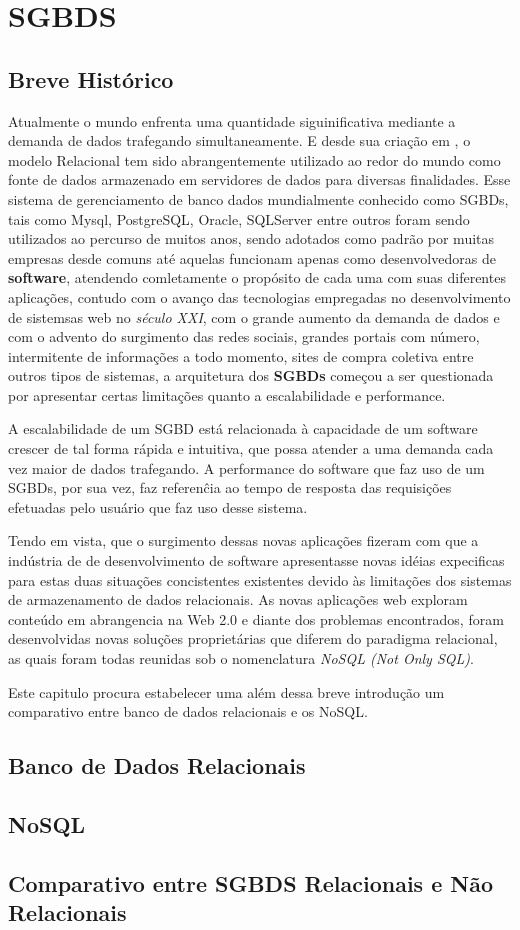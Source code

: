\chapter{SGBDS}
\thispagestyle{empty}

\section{Breve Histórico}
Atualmente o mundo enfrenta uma quantidade siguinificativa mediante a demanda de dados trafegando simultaneamente. E desde sua criação
em \cite{COOD}, o modelo Relacional tem sido abrangentemente utilizado ao redor do mundo como fonte de dados armazenado em servidores de dados para diversas
finalidades. Esse sistema de gerenciamento de banco dados mundialmente conhecido como SGBDs, tais como Mysql, PostgreSQL, Oracle, SQLServer entre outros
foram sendo utilizados ao percurso de muitos anos, sendo adotados como padrão por muitas empresas desde comuns até aquelas funcionam apenas como desenvolvedoras
de \textbf{software}, atendendo comletamente o propósito de cada uma com suas diferentes aplicações, contudo com o avanço das tecnologias empregadas no desenvolvimento
de sistemsas web no \textit{século XXI}, com o grande aumento da demanda de dados e com o advento do surgimento das redes sociais, grandes portais com número, intermitente de 
informações a todo momento, sites de compra coletiva entre outros tipos de sistemas, a arquitetura dos \textbf{SGBDs} começou a ser questionada por apresentar certas limitações 
quanto a escalabilidade e performance.

A escalabilidade de um SGBD está relacionada à capacidade de um software crescer de tal forma rápida e intuitiva, que possa atender a uma demanda cada vez maior de 
dados trafegando. A performance do software que faz uso de um SGBDs, por sua vez, faz referenĉia ao tempo de resposta das requisições efetuadas pelo usuário que faz uso desse sistema.

Tendo em vista, que o surgimento dessas novas aplicações fizeram com que a indústria de de desenvolvimento de software apresentasse novas idéias expecificas para estas duas situações concistentes
existentes devido às limitações dos sistemas de armazenamento de dados relacionais. As novas aplicações web exploram conteúdo em abrangencia na Web 2.0 e diante dos problemas encontrados, foram 
desenvolvidas novas soluções proprietárias \cite{CUNHA} que diferem do paradigma relacional, as quais foram todas reunidas sob o nomenclatura \textit{NoSQL (Not Only SQL)}.

Este capitulo procura estabelecer uma além dessa breve introdução um comparativo entre banco de dados relacionais e os NoSQL.

\section{Banco de Dados Relacionais}

\section{NoSQL}

\section{Comparativo entre SGBDS Relacionais e Não Relacionais}

